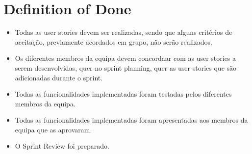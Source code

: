 \documentclass[a4paper,11pt]{article}
\begin{document}
\section{Definition of Done}
\begin{itemize}
  \item Todas as user stories devem ser realizadas, sendo que alguns critérios de aceitação, previamente acordados em grupo, não serão realizados.
  \item Os diferentes membros da equipa devem concordaar com as user stories a serem desenvolvidas, quer no sprint planning, quer as user stories que são adicionadas durante o sprint.
  \item Todas as funcionalidades implementadas foram testadas pelos diferentes membros da equipa.
  \item Todas as funcionalidades implementadas foram apresentadas aos membros da equipa que as aprovaram.
  \item O Sprint Review foi preparado.
\end{itemize}
\end{document}
